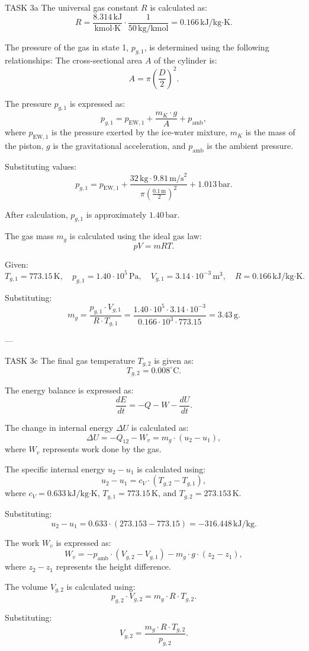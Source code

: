 TASK 3a  
The universal gas constant \( R \) is calculated as:  
\[
R = \frac{8.314 \, \text{kJ}}{\text{kmol·K}} \cdot \frac{1}{50 \, \text{kg/kmol}} = 0.166 \, \text{kJ/kg·K}.
\]

The pressure of the gas in state 1, \( p_{g,1} \), is determined using the following relationships:  
The cross-sectional area \( A \) of the cylinder is:  
\[
A = \pi \left( \frac{D}{2} \right)^2.
\]

The pressure \( p_{g,1} \) is expressed as:  
\[
p_{g,1} = p_{\text{EW},1} + \frac{m_K \cdot g}{A} + p_{\text{amb}},
\]
where \( p_{\text{EW},1} \) is the pressure exerted by the ice-water mixture, \( m_K \) is the mass of the piston, \( g \) is the gravitational acceleration, and \( p_{\text{amb}} \) is the ambient pressure.

Substituting values:  
\[
p_{g,1} = p_{\text{EW},1} + \frac{32 \, \text{kg} \cdot 9.81 \, \text{m/s}^2}{\pi \left( \frac{0.1 \, \text{m}}{2} \right)^2} + 1.013 \, \text{bar}.
\]

After calculation, \( p_{g,1} \) is approximately \( 1.40 \, \text{bar} \).

The gas mass \( m_g \) is calculated using the ideal gas law:  
\[
pV = mRT.
\]

Given:  
\[
T_{g,1} = 773.15 \, \text{K}, \quad p_{g,1} = 1.40 \cdot 10^5 \, \text{Pa}, \quad V_{g,1} = 3.14 \cdot 10^{-3} \, \text{m}^3, \quad R = 0.166 \, \text{kJ/kg·K}.
\]

Substituting:  
\[
m_g = \frac{p_{g,1} \cdot V_{g,1}}{R \cdot T_{g,1}} = \frac{1.40 \cdot 10^5 \cdot 3.14 \cdot 10^{-3}}{0.166 \cdot 10^3 \cdot 773.15} = 3.43 \, \text{g}.
\]

---

TASK 3c  
The final gas temperature \( T_{g,2} \) is given as:  
\[
T_{g,2} = 0.008^\circ \text{C}.
\]

The energy balance is expressed as:  
\[
\frac{dE}{dt} = -Q - W - \frac{dU}{dt}.
\]

The change in internal energy \( \Delta U \) is calculated as:  
\[
\Delta U = -Q_{12} - W_v = m_g \cdot (u_2 - u_1),
\]
where \( W_v \) represents work done by the gas.

The specific internal energy \( u_2 - u_1 \) is calculated using:  
\[
u_2 - u_1 = c_V \cdot (T_{g,2} - T_{g,1}),
\]
where \( c_V = 0.633 \, \text{kJ/kg·K} \), \( T_{g,1} = 773.15 \, \text{K} \), and \( T_{g,2} = 273.153 \, \text{K} \).

Substituting:  
\[
u_2 - u_1 = 0.633 \cdot (273.153 - 773.15) = -316.448 \, \text{kJ/kg}.
\]

The work \( W_v \) is expressed as:  
\[
W_v = -p_{\text{amb}} \cdot (V_{g,2} - V_{g,1}) - m_g \cdot g \cdot (z_2 - z_1),
\]
where \( z_2 - z_1 \) represents the height difference.

The volume \( V_{g,2} \) is calculated using:  
\[
p_{g,2} \cdot V_{g,2} = m_g \cdot R \cdot T_{g,2}.
\]

Substituting:  
\[
V_{g,2} = \frac{m_g \cdot R \cdot T_{g,2}}{p_{g,2}}.
\]